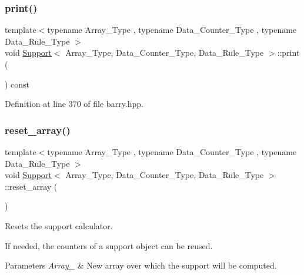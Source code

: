 \subsubsection{\texorpdfstring{print()}{print()}}
{\footnotesize\ttfamily template$<$typename Array\+\_\+\+Type , typename Data\+\_\+\+Counter\+\_\+\+Type , typename Data\+\_\+\+Rule\+\_\+\+Type $>$ \\
void \hyperlink{classbarry_1_1_support}{Support}$<$ Array\+\_\+\+Type, Data\+\_\+\+Counter\+\_\+\+Type, Data\+\_\+\+Rule\+\_\+\+Type $>$\+::print (\begin{DoxyParamCaption}{ }\end{DoxyParamCaption}) const\hspace{0.3cm}{\ttfamily [inline]}}



Definition at line 370 of file barry.\+hpp.

\mbox{\label{classbarry_1_1_support_a4f2860fd2e8e30703b91633a92ed7a58}} 
\subsubsection{\texorpdfstring{reset\+\_\+array()}{reset\_array()}\hspace{0.1cm}{\footnotesize\ttfamily [1/2]}}
{\footnotesize\ttfamily template$<$typename Array\+\_\+\+Type , typename Data\+\_\+\+Counter\+\_\+\+Type , typename Data\+\_\+\+Rule\+\_\+\+Type $>$ \\
void \hyperlink{classbarry_1_1_support}{Support}$<$ Array\+\_\+\+Type, Data\+\_\+\+Counter\+\_\+\+Type, Data\+\_\+\+Rule\+\_\+\+Type $>$\+::reset\+\_\+array (\begin{DoxyParamCaption}{ }\end{DoxyParamCaption})\hspace{0.3cm}{\ttfamily [inline]}}



Resets the support calculator. 

If needed, the counters of a support object can be reused.


\begin{DoxyParams}{Parameters}
{\em Array\+\_\+} & New array over which the support will be computed. \\
\hline
\end{DoxyParams}


